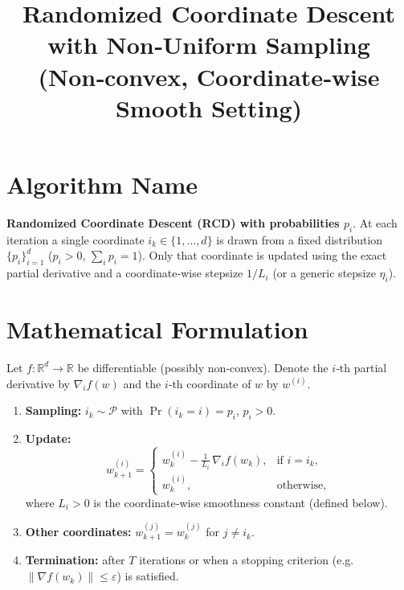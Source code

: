 \documentclass{article}
\newcommand{\R}{\mathbb{R}}
\begin{document}
\title{Randomized Coordinate Descent with Non‑Uniform Sampling\\
(Non‑convex, Coordinate‑wise Smooth Setting)}
\author{}
\date{}
\maketitle

\section*{Algorithm Name}
\textbf{Randomized Coordinate Descent (RCD) with probabilities $p_i$}.  
At each iteration a single coordinate $i_k\in\{1,\dots,d\}$ is drawn from a
fixed distribution $\{p_i\}_{i=1}^d$ ($p_i>0$, $\sum_i p_i=1$).  
Only that coordinate is updated using the exact partial derivative and a
coordinate‑wise stepsize $1/L_i$ (or a generic stepsize $\eta_i$).

\section*{Mathematical Formulation}
Let $f:\R^d\to\R$ be differentiable (possibly non‑convex).  
Denote the $i$‑th partial derivative by $\nabla_i f(w)$ and the $i$‑th
coordinate of $w$ by $w^{(i)}$.

\begin{enumerate}[label=\arabic*)]
\item \textbf{Sampling:} $i_k\sim\mathcal{P}$ with $\Pr(i_k=i)=p_i$, $p_i>0$.
\item \textbf{Update:}
\[
w_{k+1}^{(i)}=
\begin{cases}
w_k^{(i)} - \displaystyle\frac{1}{L_{i}}\,\nabla_i f(w_k), &\text{if }i=i_k,\\[2ex]
w_k^{(i)}, &\text{otherwise,}
\end{cases}
\tag{1}
\]
where $L_i>0$ is the coordinate‑wise smoothness constant (defined below).
\item \textbf{Other coordinates:} $w_{k+1}^{(j)}=w_k^{(j)}$ for $j\neq i_k$.
\item \textbf{Termination:} after $T$ iterations or when a stopping
criterion (e.g. $\| \nabla f(w_k)\| \le \varepsilon$) is satisfied.
\end{enumerate}

\end{document}

